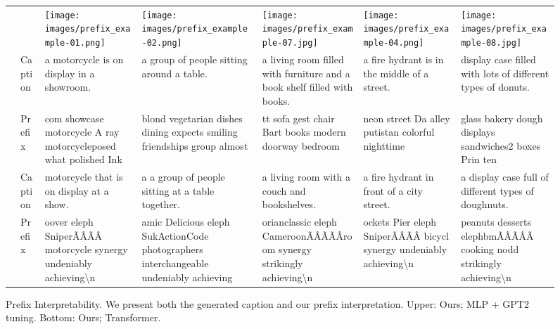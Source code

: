 \begin{figure*}
\footnotesize
\centering
\begin{tabular}{l @{\hskip 5\tabcolsep} p{}  p{}p{}p{}p{}p{}}
& &
\texttt{[image: images/prefix\_example-01.png]} &
\texttt{[image: images/prefix\_example-02.png]} &
\texttt{[image: images/prefix\_example-07.jpg]} &
\texttt{[image: images/prefix\_example-04.png]} &
\texttt{[image: images/prefix\_example-08.jpg]} 
\\
\parbox[t]{0mm}{}
& Caption & a motorcycle is on display in a showroom. & a group of people sitting around a table. & a living room filled with furniture and a book shelf filled with books. & a fire hydrant is in the middle of a street. & display case filled with lots of different types of donuts. \\
& Prefix & com showcase motorcycle A ray motorcycleposed what polished Ink & blond vegetarian dishes dining expects smiling friendships group almost & tt sofa gest chair Bart books modern doorway bedroom & neon street Da alley putistan colorful nighttime & glass bakery dough displays sandwiches2 boxes Prin ten \\

\hline
\parbox[t]{0mm}{}
& Caption & motorcycle that is on display at a show. & a a group of people sitting at a table together. & a living room with a couch and bookshelves. & a fire hydrant in front of a city street. & a display case full of different types of doughnuts.
\\
& Prefix & oover eleph SniperÃÂÃÂ motorcycle synergy undeniably achieving\textbackslash n & amic Delicious eleph SukActionCode photographers interchangeable undeniably achieving & orianclassic eleph CameroonÃÂÃÃÂroom synergy strikingly achieving\textbackslash n & ockets Pier eleph SniperÃÂÃÂ bicycl synergy undeniably achieving\textbackslash n & peanuts desserts elephbmÃÂÃÂÃ cooking nodd strikingly achieving\textbackslash n \\


\end{tabular}
\caption{Prefix Interpretability. We present both the generated caption and our prefix interpretation. Upper: Ours; MLP + GPT2 tuning. Bottom: Ours; Transformer.}
\label{fig:interpretation} 
\end{figure*}




